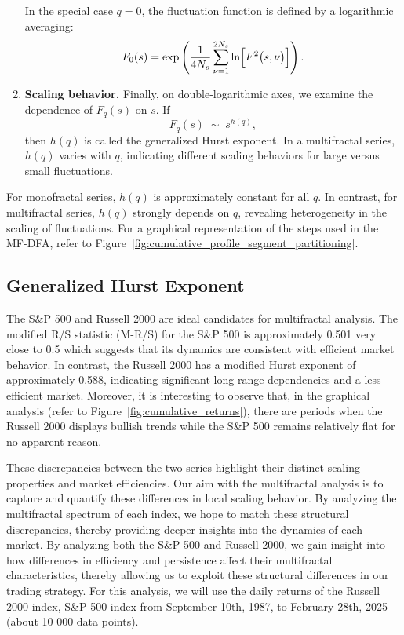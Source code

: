 \documentclass[11pt]{extarticle}
\begin{document}
\begin{enumerate}
    In the special case \(q=0\), the fluctuation function is defined by a logarithmic averaging:
    \begin{equation}
        F_0(s) = \exp\left(\frac{1}{4N_s} \sum_{\nu=1}^{2N_s} \ln\Bigl[F^2\bigl(s,\nu\bigr)\Bigr]\right).
    \end{equation}


    \item \textbf{Scaling behavior.} Finally, on double-logarithmic axes, we examine the dependence of \(F_q(s)\) on \(s\). If
    \begin{equation}
        F_q(s) \;\sim\; s^{h(q)},
    \end{equation}
    then \(h(q)\) is called the generalized Hurst exponent. In a multifractal series, \(h(q)\) varies with \(q\),
    indicating different scaling behaviors for large versus small fluctuations.
\end{enumerate}

For monofractal series, \(h(q)\) is approximately constant for all \(q\). In contrast, for multifractal
series, \(h(q)\) strongly depends on \(q\), revealing heterogeneity in the scaling of fluctuations.
For a graphical representation of the steps used in the MF-DFA, refer to Figure~\ref{fig:cumulative_profile_segment_partitioning}.

\subsection{Generalized Hurst Exponent}
\label{subsec:gen_hurst}

The S\&P 500 and Russell 2000 are ideal candidates for multifractal analysis.
The modified R/S statistic (M-R/S) for the S\&P 500 is approximately 0.501 very close to 0.5 which suggests that its
dynamics are consistent with efficient market behavior. In contrast, the Russell 2000 has a modified Hurst exponent of
approximately 0.588, indicating significant long-range dependencies and a less efficient market. Moreover, it is interesting
to observe that, in the graphical analysis (refer to Figure~\ref{fig:cumulative_returns}), there are periods when the Russell 2000
displays bullish trends while the S\&P 500 remains relatively flat for no apparent reason.

These discrepancies between the two series highlight their distinct scaling properties and market efficiencies. Our aim with
the multifractal analysis is to capture and quantify these differences in local scaling behavior. By analyzing the multifractal spectrum
of each index, we hope to match these structural discrepancies, thereby providing deeper insights into the dynamics of each market.
By analyzing both the S\&P 500 and Russell 2000, we gain insight into how differences in efficiency and persistence
affect their multifractal characteristics, thereby allowing us to exploit these structural differences in our trading strategy.
For this analysis, we will use the daily returns of the Russell 2000 index, S\&P 500 index from September 10th, 1987, to February 28th, 2025 (about 10 000 data points).
\end{document}
